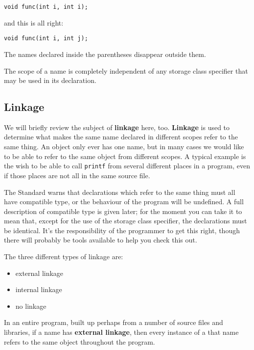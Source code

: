 \begin{Verbatim}
void func(int i, int i);
\end{Verbatim}

   and this is all right:


\begin{Verbatim}
void func(int i, int j);
\end{Verbatim}

   The names declared inside the parentheses disappear outside them.


   The scope of a name is completely independent of any storage class
    specifier that may be used in its declaration.


  

  \subsection{Linkage}
   

   We will briefly review the subject of \textbf{linkage} here, too.
    \textbf{Linkage} is used to determine what makes the same name
    declared in different scopes refer to the same thing. An object only
    ever has one name, but in many cases we would like to be able to refer
    to the same object from different scopes. A typical example is the wish
    to be able to call \texttt{printf} from several different places in
    a program, even if those places are not all in the same source file.


   The Standard warns that declarations which refer to the same thing
    must all have compatible type, or the behaviour of the program will be
    undefined. A full description of compatible type is given later; for the
    moment you can take it to mean that, except for the use of the storage
    class specifier, the declarations must be identical. It's the
    responsibility of the programmer to get this right, though there will
    probably be tools available to help you check this out.


   The three different types of linkage are:


   \begin{itemize}
    \item external linkage
    \item internal linkage
    \item no linkage
   \end{itemize}

   In an entire program, built up perhaps from a number of source files
    and libraries, if a name has \textbf{external linkage}, then every
    instance of a that name refers to the same object throughout the
    program.


